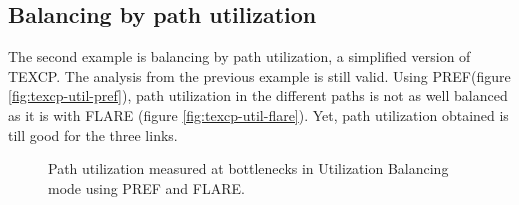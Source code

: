 \subsection{Balancing by path utilization}

The second example is  balancing by path utilization, a simplified version of TEXCP. The analysis from the previous example is still valid. Using PREF(figure \ref{fig:texcp-util-pref}), path utilization in the different paths is not as well balanced as it is with FLARE (figure \ref{fig:texcp-util-flare}). Yet, path utilization obtained is till good for the three links. 


\begin{figure}[h]
\centering
{}
\label{fig:texcpComparison}
\caption{Path utilization measured at bottlenecks in Utilization Balancing mode using  PREF and  FLARE.}
\end{figure}


